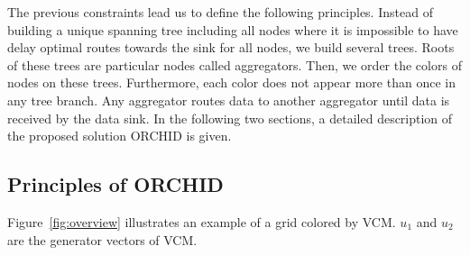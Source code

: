 The previous constraints lead us to define the following principles. 
Instead of building a unique spanning tree including all nodes where it is impossible to have delay optimal routes towards the sink for all nodes, we build several trees. Roots of these trees are particular nodes called aggregators. Then, we order the colors of nodes on these trees. Furthermore, each color does not appear more than once in any tree branch. Any aggregator routes data to another aggregator until data is received by the data sink. In the following two sections, a detailed description of the proposed solution ORCHID is given.


\subsection{Principles of ORCHID}
Figure~\ref{fig:overview} illustrates an example of a grid colored by VCM. $u_1$ and $u_2$ are the generator vectors of VCM.
